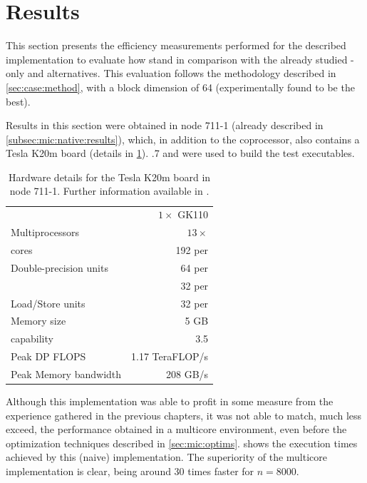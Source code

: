 \documentclass[../thesis]{subfiles}
\begin{document}
	\section{Results}
	\label{sec:cuda:results}

	This section presents the efficiency measurements performed for the described \cuda implementation to evaluate how \gpus stand in comparison with the already studied \cpu-only and \intel\xeonphi alternatives. This evaluation follows the methodology described in \cref{sec:case:method}, with a block dimension of 64 (experimentally found to be the best).

	Results in this section were obtained in \search node 711-1 (already described in \cref{subsec:mic:native:results}), which, in addition to the \intel\xeonphi coprocessor, also contains a \nvidia Tesla K20m board (details in \cref{tab:k20m}). .7 and  were used to build the test executables.

	\begin{table}
		\centering
		\begin{tabular}{lr}
			\hline
			\gpus & $1\times$ GK110 \\
			Multiprocessors & $13\times$ \smx \\
			\cuda cores & 192 per \smx \\
			Double-precision units & 64 per \smx \\
			\sfus & 32 per \smx \\
			Load/Store units & 32 per \smx \\
			Memory size & 5 GB \\
			\cuda capability & 3.5 \\
			\hline
			Peak DP FLOPS & 1.17 TeraFLOP/s \\
			Peak Memory bandwidth & 208 GB/s \\
			\hline
		\end{tabular}
		\caption{Hardware details for the \nvidia Tesla K20m board in \search node 711-1. Further information available in \cite{NVIDIA:KEPLER,NVIDIA:TeslaKSeriesOverview}.}
		\label{tab:k20m}
	\end{table}

	Although this implementation was able to profit in some measure from the experience gathered in the previous chapters, it was not able to match, much less exceed, the performance obtained in a multicore environment, even before the optimization techniques described in \cref{sec:mic:optims}.  shows the execution times achieved by this (naive) \cuda implementation. The superiority of the multicore implementation is clear, being around 30 times faster for $n=8000$.
\end{document}

